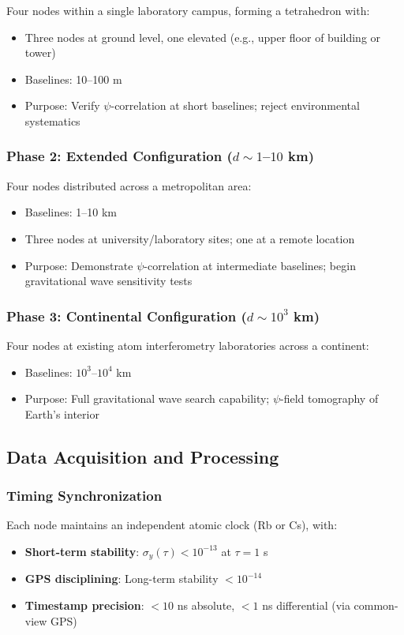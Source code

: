 \documentclass[12pt,a4paper]{article}
\theoremstyle{remark}
\begin{document}
Four nodes within a single laboratory campus, forming a tetrahedron with:
\begin{itemize}
\item Three nodes at ground level, one elevated (e.g., upper floor of
building or tower)
\item Baselines: 10--100 m
\item Purpose: Verify $\psi$-correlation at short baselines; reject
environmental systematics
\end{itemize}

\subsubsection{Phase 2: Extended Configuration ($d \sim 1$--$10$ km)}

Four nodes distributed across a metropolitan area:
\begin{itemize}
\item Baselines: 1--10 km
\item Three nodes at university/laboratory sites; one at a remote location
\item Purpose: Demonstrate $\psi$-correlation at intermediate baselines;
begin gravitational wave sensitivity tests
\end{itemize}

\subsubsection{Phase 3: Continental Configuration ($d \sim 10^3$ km)}

Four nodes at existing atom interferometry laboratories across a continent:
\begin{itemize}
\item Baselines: $10^3$--$10^4$ km
\item Purpose: Full gravitational wave search capability; $\psi$-field
tomography of Earth's interior
\end{itemize}

\subsection{Data Acquisition and Processing}\label{sec:data-processing}

\subsubsection{Timing Synchronization}

Each node maintains an independent atomic clock (Rb or Cs), with:
\begin{itemize}
\item \textbf{Short-term stability}: $\sigma_y(\tau) < 10^{-13}$ at $\tau = 1$ s
\item \textbf{GPS disciplining}: Long-term stability $< 10^{-14}$
\item \textbf{Timestamp precision}: $< 10$ ns absolute, $< 1$ ns differential
(via common-view GPS)
\end{itemize}
\end{document}
